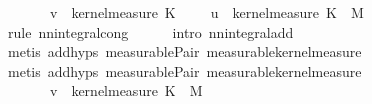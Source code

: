 \begin{isabellebody}
\ \ \ {\isasymintegral}\isactrlsup {\isacharplus}{\kern0pt}\ {\isasymomega}\ {\isacharparenleft}{\kern0pt}{\isasymintegral}\isactrlsup {\isacharplus}{\kern0pt}\ {\isasymomega}\ v\ {\isacharparenleft}{\kern0pt}{\isasymomega}\ {\isasymomega}kernel{\isacharunderscore}{\kern0pt}measure\ K\ {\isasymomega}\ {\isacharplus}{\kern0pt}\ {\isacharparenleft}{\kern0pt}{\isasymintegral}\isactrlsup {\isacharplus}{\kern0pt}\ {\isasymomega}\ u\ {\isacharparenleft}{\kern0pt}{\isasymomega}\ {\isasymomega}kernel{\isacharunderscore}{\kern0pt}measure\ K\ {\isasymomega}\ {\isasympartial}M{\isachardoublequoteclose}\isanewline
\ \ \ \ \isamarkupfalse%
\ {\isacharparenleft}{\kern0pt}rule\ nn{\isacharunderscore}{\kern0pt}integral{\isacharunderscore}{\kern0pt}cong{\isacharparenright}{\kern0pt}\isanewline
\ \ \ \ \isamarkupfalse%
\ {\isacharparenleft}{\kern0pt}intro\ nn{\isacharunderscore}{\kern0pt}integral{\isacharunderscore}{\kern0pt}add{\isacharparenright}{\kern0pt}\isanewline
\ \ \ \ \ \isamarkupfalse%
\ {\isacharparenleft}{\kern0pt}metis\ add{\isachardot}{\kern0pt}hyps{\isacharparenleft}{\kern0pt}{}{\isacharparenright}{\kern0pt}\ measurable{\isacharunderscore}{\kern0pt}Pair{}\ measurable{\isacharunderscore}{\kern0pt}kernel{\isacharunderscore}{\kern0pt}measure{\isacharparenright}{\kern0pt}\isanewline
\ \ \ \ \ \isamarkupfalse%
\ {\isacharparenleft}{\kern0pt}metis\ add{\isachardot}{\kern0pt}hyps{\isacharparenleft}{\kern0pt}{}{\isacharparenright}{\kern0pt}\ measurable{\isacharunderscore}{\kern0pt}Pair{}\ measurable{\isacharunderscore}{\kern0pt}kernel{\isacharunderscore}{\kern0pt}measure{\isacharparenright}{\kern0pt}\isanewline
\ \ \ \ \isamarkupfalse%
\isanewline
\ \ \isamarkupfalse%
\ \isamarkupfalse%
\ {\isachardoublequoteopen}{\isachardot}{\kern0pt}{\isachardot}{\kern0pt}{\isachardot}{\kern0pt}\ {\isacharequal}{\kern0pt}\ {\isacharparenleft}{\kern0pt}{\isasymintegral}\isactrlsup {\isacharplus}{\kern0pt}\ {\isasymomega}\ {\isasymintegral}\isactrlsup {\isacharplus}{\kern0pt}\ {\isasymomega}\ v\ {\isacharparenleft}{\kern0pt}{\isasymomega}\ {\isasymomega}kernel{\isacharunderscore}{\kern0pt}measure\ K\ {\isasymomega}\ {\isasympartial}M{\isacharparenright}{\kern0pt}\ \isanewline

\end{isabellebody}
